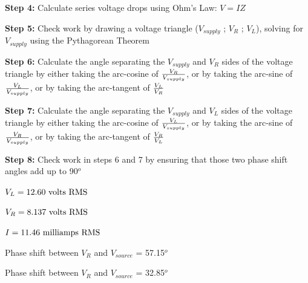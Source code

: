 {\bf Step 4:} Calculate series voltage drops using Ohm's Law: $V = {I Z}$

\vskip 5pt

{\bf Step 5:} Check work by drawing a voltage triangle ($V_{supply}$ ; $V_R$ ; $V_L$), solving for $V_{supply}$ using the Pythagorean Theorem

\vskip 5pt

{\bf Step 6:} Calculate the angle separating the $V_{supply}$ and $V_{R}$ sides of the voltage triangle by either taking the arc-cosine of $V_R \over V_{supply}$, or by taking the arc-sine of $V_L \over V_{supply}$, or by taking the arc-tangent of $V_L \over V_R$

\vskip 5pt

{\bf Step 7:} Calculate the angle separating the $V_{supply}$ and $V_{L}$ sides of the voltage triangle by either taking the arc-cosine of $V_L \over V_{supply}$, or by taking the arc-sine of $V_R \over V_{supply}$, or by taking the arc-tangent of $V_R \over V_L$

\vskip 5pt

{\bf Step 8:} Check work in steps 6 and 7 by ensuring that those two phase shift angles add up to 90$^{o}$

\vskip 10pt

$V_L = 12.60 \hbox{ volts RMS}$

\vskip 10pt

$V_R = 8.137 \hbox{ volts RMS}$

\vskip 10pt

$I = 11.46 \hbox{ milliamps RMS}$

\vskip 10pt

Phase shift between $V_R$ and $V_{source}$ = 57.15$^{o}$

\vskip 10pt

Phase shift between $V_R$ and $V_{source}$ = 32.85$^{o}$




